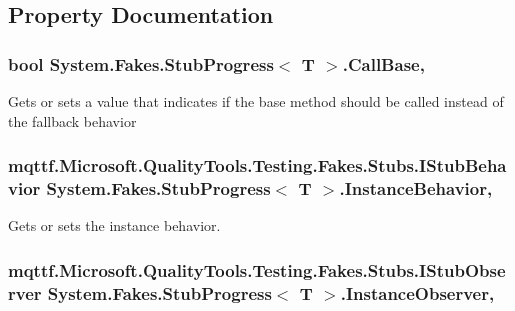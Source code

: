 \subsection{Property Documentation}
\hypertarget{class_system_1_1_fakes_1_1_stub_progress_3_01_t_01_4_a954441372f53825d156fc5c1a057ee11}{
\subsubsection[{Call\-Base}]{\setlength{\rightskip}{0pt plus 5cm}bool System.\-Fakes.\-Stub\-Progress$<$ T $>$.Call\-Base\hspace{0.3cm}{\ttfamily [get]}, {\ttfamily [set]}}}\label{class_system_1_1_fakes_1_1_stub_progress_3_01_t_01_4_a954441372f53825d156fc5c1a057ee11}


Gets or sets a value that indicates if the base method should be called instead of the fallback behavior

\hypertarget{class_system_1_1_fakes_1_1_stub_progress_3_01_t_01_4_ae5145862429921ed110ed1d85dfc69dd}{
\subsubsection[{Instance\-Behavior}]{\setlength{\rightskip}{0pt plus 5cm}mqttf.\-Microsoft.\-Quality\-Tools.\-Testing.\-Fakes.\-Stubs.\-I\-Stub\-Behavior System.\-Fakes.\-Stub\-Progress$<$ T $>$.Instance\-Behavior\hspace{0.3cm}{\ttfamily [get]}, {\ttfamily [set]}}}\label{class_system_1_1_fakes_1_1_stub_progress_3_01_t_01_4_ae5145862429921ed110ed1d85dfc69dd}


Gets or sets the instance behavior.

\hypertarget{class_system_1_1_fakes_1_1_stub_progress_3_01_t_01_4_a3824ad5b60eeb65c854b22c53dbc2469}{
\subsubsection[{Instance\-Observer}]{\setlength{\rightskip}{0pt plus 5cm}mqttf.\-Microsoft.\-Quality\-Tools.\-Testing.\-Fakes.\-Stubs.\-I\-Stub\-Observer System.\-Fakes.\-Stub\-Progress$<$ T $>$.Instance\-Observer\hspace{0.3cm}{\ttfamily [get]}, {\ttfamily [set]}}}\label{class_system_1_1_fakes_1_1_stub_progress_3_01_t_01_4_a3824ad5b60eeb65c854b22c53dbc2469}


